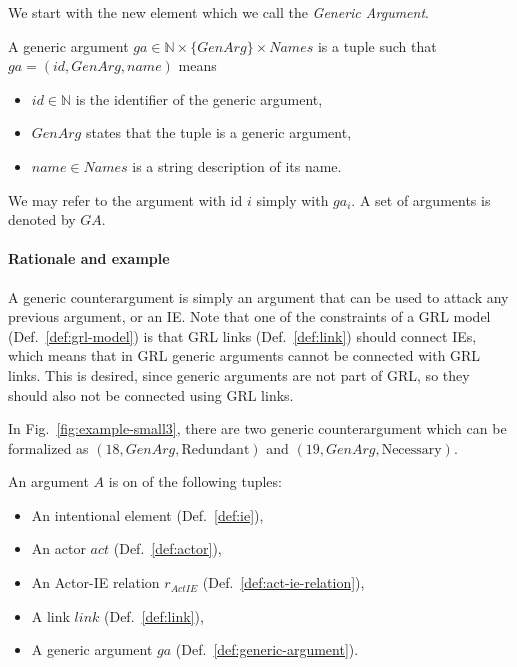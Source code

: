 We start with the new element which we call the \emph{Generic Argument}.

\begin{definition}
\label{def:generic-argument}
A generic argument $ga \in \mathbb{N}\times \{GenArg\}\times Names$ is a tuple such that $ga=(id, GenArg, name)$ means
\begin{itemize}
\item $id\in \mathbb{N}$ is the identifier of the generic argument,
\item $GenArg$ states that the tuple is a generic argument,
\item $name\in Names$ is a string description of its name.
\end{itemize}
We may refer to the argument with id $i$ simply with $ga_i$. A set of arguments is denoted by $GA$.
\end{definition}

\paragraph{Rationale and example} A generic counterargument is simply an argument that can be used to attack any previous argument, or an IE. Note that one of the constraints of a GRL model (Def.~\ref{def:grl-model}) is that GRL links (Def.~\ref{def:link}) should connect IEs, which means that in GRL generic arguments cannot be connected with GRL links. This is desired, since generic arguments are not part of GRL, so they should also not be connected using GRL links. 

In Fig.~\ref{fig:example-small3}, there are two generic counterargument which can be formalized as $(18,GenArg, \text{Redundant})$ and $(19, GenArg, \text{Necessary})$.

\begin{definition}[Argument]
\label{def:argument}
An argument $A$ is on of the following tuples:
\begin{itemize}
\item An intentional element (Def.~\ref{def:ie}), 
\item An actor $act$ (Def.~\ref{def:actor}),
\item An Actor-IE relation $r_{ActIE}$ (Def.~\ref{def:act-ie-relation}), 
\item A link $link$ (Def.~\ref{def:link}),
\item A generic argument $ga$ (Def.~\ref{def:generic-argument}).
\end{itemize}
\end{definition}

